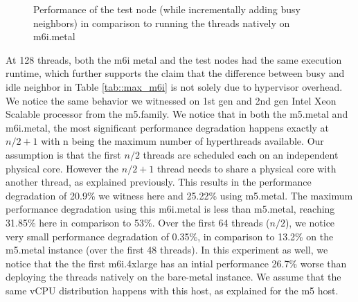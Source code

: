 \begin{figure}[H]
\caption{ Performance of the test node (while incrementally adding busy neighbors) in
comparison to running the threads natively on m6i.metal}
\end{figure}
\noindent
At 128 threads, both the m6i metal and the 
test nodes had the same execution runtime, which further supports the claim that the difference between 
busy and idle neighbor in Table \ref{tab::max_m6i} is not solely due to hypervisor overhead.  
We notice the same behavior we witnessed on 1st gen and 2nd gen Intel Xeon Scalable processor from the 
m5.family. We notice that in both the m5.metal and m6i.metal, the most significant performance degradation 
happens exactly at    \begin{math}n / 2 + 1\end{math} with n being the maximum number of hyperthreads 
available. Our assumption is that the first \begin{math}n/2\end{math} threads are scheduled 
each on an independent physical core. However the \begin{math}n / 2 + 1\end{math} thread needs to share 
a physical core with another thread, as explained previously. This results in the performance degradation 
of 20.9\% we witness here and 25.22\% using m5.metal. The maximum performance degradation using this 
m6i.metal is less than m5.metal, reaching 31.85\% here in comparison to 53\%. Over the first 64 
threads (\begin{math}n/2\end{math}), we notice very small performance degradation of 0.35\%, in 
comparison to 13.2\% on the m5.metal instance (over the first 48 threads). In this experiment as well, 
we notice that the the first m6i.4xlarge has an intial performance 26.7\% worse than deploying the 
threads natively on the bare-metal instance. We assume that the same vCPU distribution happens with this 
host, as explained for the m5 host. \\
